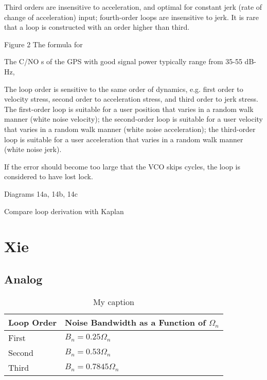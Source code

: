 Third orders are insensitive
to acceleration, and optimal for constant jerk (rate of change of acceleration) input; fourth-order loops are insensitive
to jerk. It is rare that a loop is constructed with an
order higher than third.

Figure 2
The formula for 

The
C/NO s of the GPS with good signal power typically range
from 35-55 dB-Hz,

The loop order is sensitive to the same order of dynamics,
e.g. first order to velocity stress, second order to acceleration
stress, and third order to jerk stress. The first-order
loop is suitable for a user position that varies in a random
walk manner (white noise velocity); the second-order loop
is suitable for a user velocity that varies in a random walk
manner (white noise acceleration); the third-order loop is
suitable for a user acceleration that varies in a random walk
manner (white noise jerk).

If the error should become too
large that the VCO skips cycles, the loop is considered to have lost lock.

Diagrams 14a, 14b, 14c 

Compare loop derivation with Kaplan

\section{Xie}

\cite{PengXie}
\subsection{Analog}

\begin{table}[!htb]
\centering
\begin{tabular}{|l|l|}
\hline
\rowcolor[HTML]{C0C0C0} 
Loop Order & Noise Bandwidth as a Function of $\Omega_n$ \\ \hline
First      & $B_n = 0.25 \Omega_n$                       \\ \hline
\rowcolor[HTML]{EFEFEF} 
Second     & $B_n = 0.53 \Omega_n$                       \\ \hline
Third      &  $B_n = 0.7845\Omega_n$                \\ \hline
\end{tabular}
\caption{My caption}
\label{tab:LoopOrderNoiseBandwith}
\end{table}

